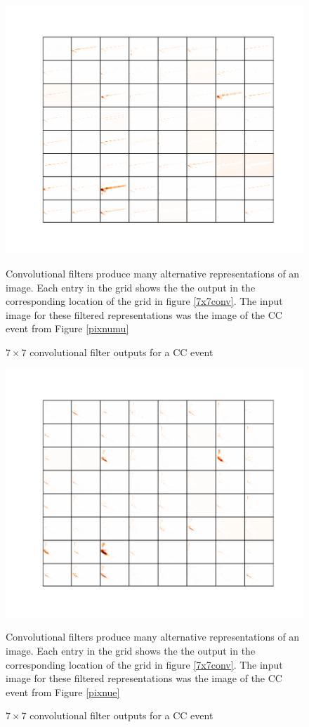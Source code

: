\begin{figure}
\includegraphics[width=\textwidth]{figures/cnn/feat1_truetype2_caltype2_event274_y.pdf}
\caption{$7\times7$ convolutional filter outputs for a \numu CC event}{
Convolutional filters produce many alternative representations of an image.
Each entry in the grid shows the the output in the corresponding location
of the grid in figure \ref{7x7conv}.
The input image for these filtered representations was the \yview image
of the \numu CC event from Figure \ref{pixnumu}
}
\label{7x7numu}
\end{figure}


\begin{figure}
\includegraphics[width=\textwidth]{figures/cnn/feat1_truetype6_caltype6_event155_y.pdf}
\caption{$7\times7$ convolutional filter outputs for a \nue CC event}{
Convolutional filters produce many alternative representations of an image.
Each entry in the grid shows the the output in the corresponding location
of the grid in figure \ref{7x7conv}.
The input image for these filtered representations was the \yview image
of the \nue CC event from Figure \ref{pixnue}
}
\label{7x7nue}
\end{figure}


